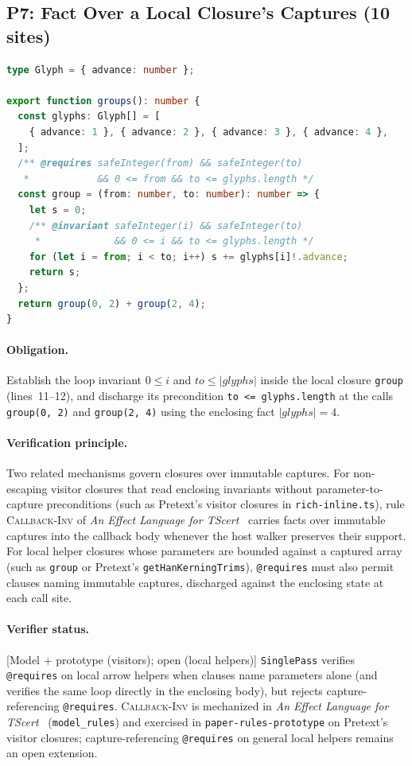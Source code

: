 \documentclass[10pt,a4paper]{article}
\newcommand{\len}[1]{|#1|}
\newcommand{\code}[1]{\textcolor{codec}{\texttt{#1}}}
\newcommand{\lean}[1]{\texttt{\small #1}}
\newcommand{\ruleName}[1]{\textcolor{rulec}{\textsc{#1}}}
\newcommand{\statuso}[1]{\textcolor{accent}{\textsf{\small[#1]}}}
\newcommand{\entry}[1]{\paragraph{#1.}}
\renewcommand{\lean}[1]{\textcolor{leanc}{\texttt{\small #1}}}%
\begin{document}
\subsection{P7: Fact Over a Local Closure's Captures (10 sites)}\label{sec:p7}

\begin{lstlisting}[language=TypeScript]
type Glyph = { advance: number };

export function groups(): number {
  const glyphs: Glyph[] = [
    { advance: 1 }, { advance: 2 }, { advance: 3 }, { advance: 4 },
  ];
  /** @requires safeInteger(from) && safeInteger(to)
   *            && 0 <= from && to <= glyphs.length */
  const group = (from: number, to: number): number => {
    let s = 0;
    /** @invariant safeInteger(i) && safeInteger(to)
     *             && 0 <= i && to <= glyphs.length */
    for (let i = from; i < to; i++) s += glyphs[i]!.advance;
    return s;
  };
  return group(0, 2) + group(2, 4);
}
\end{lstlisting}

\entry{Obligation}
Establish the loop invariant $0\le i$ and
$\mathit{to}\le\len{\mathit{glyphs}}$ inside the local closure
\code{group} (lines~11--12), and discharge its precondition
\code{to <= glyphs.length} at the calls \code{group(0, 2)} and
\code{group(2, 4)} using the enclosing fact $\len{\mathit{glyphs}}=4$.

\entry{Verification principle}
Two related mechanisms govern closures over immutable captures. For
non-escaping visitor closures that read enclosing invariants without
parameter-to-capture preconditions (such as Pretext's visitor closures
in \code{rich-inline.ts}), rule \ruleName{Callback-Inv} of \emph{An
Effect Language for TScert}~\cite{el} carries facts over immutable
captures into the callback body whenever the host walker preserves their
support. For local helper closures whose parameters are bounded against
a captured array (such as \code{group} or Pretext's
\code{getHanKerningTrims}), \code{@requires} must also permit clauses
naming immutable captures, discharged against the enclosing state at
each call site.

\entry{Verifier status}
\statuso{Model + prototype (visitors); open (local helpers)}
\lean{SinglePass} verifies \code{@requires} on local arrow helpers when
clauses name parameters alone (and verifies the same loop directly in
the enclosing body), but rejects capture-referencing \code{@requires}.
\ruleName{Callback-Inv} is mechanized in \emph{An Effect Language for
TScert}~\cite{el} (\lean{model\_rules}) and exercised in
\code{paper-rules-prototype} on Pretext's visitor closures;
capture-referencing \code{@requires} on general local helpers remains an
open extension.
\end{document}
